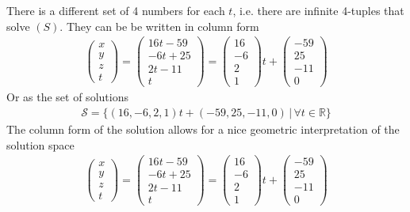 {There is a different set of 4 numbers for each $t$, i.e. there are infinite 4-tuples that solve  $(S)$. They can be be written in column form
\begin{align*}
\begin{pmatrix}
   x \\
   y \\
   z \\
   t
\end{pmatrix}
=
\begin{pmatrix}
   16t - 59 \\
   -6t + 25\\
    2t - 11\\
     t
\end{pmatrix}
=
\begin{pmatrix}
   16 \\
    -6 \\
   2\\
   1
\end{pmatrix}
t
+
\begin{pmatrix}
   -59 \\
    25 \\
   -11 \\
     0
\end{pmatrix}
\end{align*}
Or as the set of solutions
\begin{align*}
\mathcal{S} = \{ (16,-6,2,1)t + (-59,25,-11,0) \, | \, \forall	t\in\mathbb{R} \}
\end{align*}
The column form of the solution allows for a nice geometric interpretation of the solution space
\begin{align*}
\begin{pmatrix}
   x \\
   y \\
   z \\
   t
\end{pmatrix}
=
\begin{pmatrix}
   16t - 59 \\
   -6t + 25\\
    2t - 11\\
     t
\end{pmatrix}
=
\begin{pmatrix}
   16 \\
    -6 \\
   2\\
   1
\end{pmatrix}
t
+
\begin{pmatrix}
   -59 \\
    25 \\
   -11 \\
     0
\end{pmatrix}
\end{align*}
\begin{center}
\end{center}}
